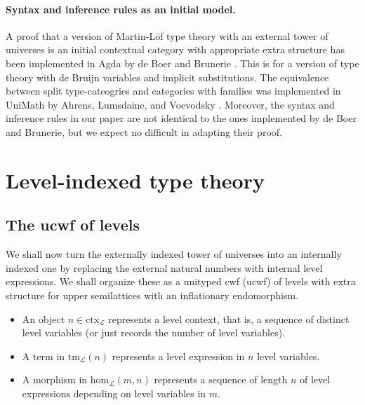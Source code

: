 \documentclass[11pt,a4paper]{article}
\theoremstyle{definition}
\newcommand{\Ctx}{\mathrm{Ctx}}
\newcommand{\Tm}{\mathrm{Tm}}
\def\Ctx{\mathrm{ctx}}
\def\Tm{\mathrm{tm}}
\def\Hom{\mathrm{hom}}
\def\L{{\mathcal{L}}}
\begin{document}
\paragraph{Syntax and inference rules as an initial model.} A proof that a version of Martin-Löf type theory with an external tower of universes  is an initial contextual category with appropriate extra structure has been implemented in Agda by de Boer and Brunerie \cite{Brunerie:initiality,deBoer:lic}. This is for a version of type theory with de Bruijn variables and implicit substitutions. The equivalence between split type-cateogries and categories with families was implemented in UniMath by Ahrens, Lumsdaine, and Voevodsky \cite{AhrensLV18}. Moreover, the syntax and inference rules in our paper \cite{BezemCDE22} are not identical to the ones implemented by de Boer and Brunerie, but we expect no difficult in adapting their proof.

\section{Level-indexed type theory}

\subsection{The ucwf of levels}
We shall now turn the externally indexed tower of universes into an internally indexed one by replacing the external natural numbers with internal level expressions. We shall organize these as a unityped cwf (ucwf) of levels  with extra structure for upper semilattices with an inflationary endomorphism. 
\begin{itemize}
\item 
An object $n \in \Ctx_\L$ represents a level context, that is, a sequence of distinct level variables (or just records the number of level variables). 
\item
A term in $\Tm_\L(n)$ represents a level expression in $n$ level variables.
\item
A morphism in $\Hom_\L(m,n)$ represents a sequence of length $n$ of level expressions depending on level variables in $m$.
\end{itemize}
\end{document}
